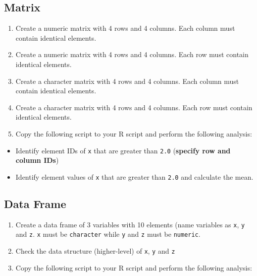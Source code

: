 \documentclass[
]{book}
\providecommand{\tightlist}{%
  \setlength{\itemsep}{0pt}\setlength{\parskip}{0pt}}
\begin{document}
\hypertarget{matrix-1}{%
\subsection{Matrix}\label{matrix-1}}

\begin{enumerate}
\def\labelenumi{\alph{enumi}.}
\tightlist
\item
  Create a numeric matrix with 4 rows and 4 columns. Each column must contain identical elements.
\item
  Create a numeric matrix with 4 rows and 4 columns. Each row must contain identical elements.
\item
  Create a character matrix with 4 rows and 4 columns. Each column must contain identical elements.
\item
  Create a character matrix with 4 rows and 4 columns. Each row must contain identical elements.
\item
  Copy the following script to your R script and perform the following analysis:
\end{enumerate}

\begin{itemize}
\tightlist
\item
  Identify element IDs of \texttt{x} that are greater than \texttt{2.0} (\textbf{specify row and column IDs})
\item
  Identify element values of \texttt{x} that are greater than \texttt{2.0} and calculate the mean.
\end{itemize}

\hypertarget{data-frame-1}{%
\subsection{Data Frame}\label{data-frame-1}}

\begin{enumerate}
\def\labelenumi{\alph{enumi}.}
\tightlist
\item
  Create a data frame of 3 variables with 10 elements (name variables as \texttt{x}, \texttt{y} and \texttt{z}. \texttt{x} must be \texttt{character} while \texttt{y} and \texttt{z} must be \texttt{numeric}.
\item
  Check the data structure (higher-level) of \texttt{x}, \texttt{y} and \texttt{z}
\item
  Copy the following script to your R script and perform the following analysis:
\end{enumerate}
\end{document}
